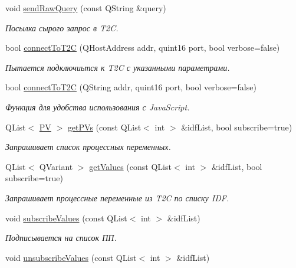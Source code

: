 \begin{DoxyCompactItemize}
void \hyperlink{class_t2_c_manager_ac1c49cf0542525095c469e39dfefa10f}{send\-Raw\-Query} (const Q\-String \&query)
\begin{DoxyCompactList}\small\item\em Посылка сырого запрос в T2\-C. \end{DoxyCompactList}\item 
bool \hyperlink{class_t2_c_manager_a6f8148641b9e93f139c7be7545564256}{connect\-To\-T2\-C} (Q\-Host\-Address addr, quint16 port, bool verbose=false)
\begin{DoxyCompactList}\small\item\em Пытается подключиьтся к T2\-C с указанными параметрами. \end{DoxyCompactList}\item 
bool \hyperlink{class_t2_c_manager_ae2d1b84a8ce64cd625b377656e787879}{connect\-To\-T2\-C} (Q\-String addr, quint16 port, bool verbose=false)
\begin{DoxyCompactList}\small\item\em Функция для удобства использования с Java\-Script. \end{DoxyCompactList}\item 
Q\-List$<$ \hyperlink{struct_p_v}{P\-V} $>$ \hyperlink{class_t2_c_manager_a9e8e91c3360e804fa027c109809a088f}{get\-P\-Vs} (const Q\-List$<$ int $>$ \&idf\-List, bool subscribe=true)
\begin{DoxyCompactList}\small\item\em Запрашивает список процессных переменных. \end{DoxyCompactList}\item 
Q\-List$<$ Q\-Variant $>$ \hyperlink{class_t2_c_manager_a37bd99d5b51446cc6d5028e59b83ebc5}{get\-Values} (const Q\-List$<$ int $>$ \&idf\-List, bool subscribe=true)
\begin{DoxyCompactList}\small\item\em Запрашивает процессные переменные из T2\-C по списку I\-D\-F. \end{DoxyCompactList}\item 
void \hyperlink{class_t2_c_manager_a36ab4631895652156f9d5ce15ecc6838}{subscribe\-Values} (const Q\-List$<$ int $>$ \&idf\-List)
\begin{DoxyCompactList}\small\item\em Подписывается на список ПП. \end{DoxyCompactList}\item 
void \hyperlink{class_t2_c_manager_abb3969cc1325926859444dad50a3c726}{unsubscribe\-Values} (const Q\-List$<$ int $>$ \&idf\-List)

\end{DoxyCompactItemize}

